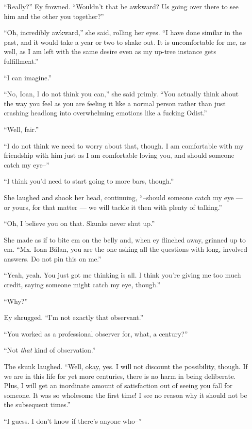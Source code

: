``Really?'' Ey frowned. ``Wouldn't that be awkward? Us going over there to see him and the other you together?''

``Oh, incredibly awkward,'' she said, rolling her eyes. ``I have done similar in the past, and it would take a year or two to shake out. It is uncomfortable for me, as well, as I am left with the same desire even as my up-tree instance gets fulfillment.''

``I can imagine.''

``No, Ioan, I do not think you can,'' she said primly. ``You actually think about the way you feel as you are feeling it like a normal person rather than just crashing headlong into overwhelming emotions like a fucking Odist.''

``Well, fair.''

``I do not think we need to worry about that, though. I am comfortable with my friendship with him just as I am comfortable loving you, and should someone catch my eye--''

``I think you'd need to start going to more bars, though.''

She laughed and shook her head, continuing, ``--should someone catch my eye — or yours, for that matter — we will tackle it then with plenty of talking.''

``Oh, I believe you on that. Skunks never shut up.''

She made as if to bite em on the belly and, when ey flinched away, grinned up to em. ``Mx. Ioan Bălan, you are the one asking all the questions with long, involved answers. Do not pin this on me.''

``Yeah, yeah. You just got me thinking is all. I think you're giving me too much credit, saying someone might catch my eye, though.''

``Why?''

Ey shrugged. ``I'm not exactly that observant.''

``You worked as a professional observer for, what, a century?''

``Not \emph{that} kind of observation.''

The skunk laughed. ``Well, okay, yes. I will not discount the possibility, though. If we are in this life for yet more centuries, there is no harm in being deliberate. Plus, I will get an inordinate amount of satisfaction out of seeing you fall for someone. It was so wholesome the first time! I see no reason why it should not be the subsequent times.''

``I guess. I don't know if there's anyone who--''

